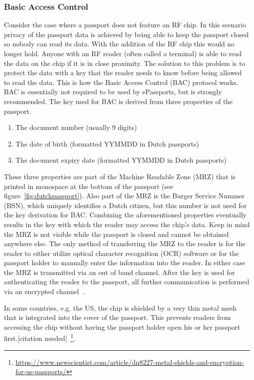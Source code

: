 \subsubsection{Basic Access Control}
Consider the case where a passport does not feature an RF chip. In this scenario privacy of the passport data is achieved by being able to keep the passport closed so nobody can read its data. With the addition of the RF chip this would no longer hold. Anyone with an RF reader (often called a terminal) is able to read the data on the chip if it is in close proximity. The solution to this problem is to protect the data with a key that the reader needs to know before being allowed to read the data. This is how the Basic Access Control (BAC) protocol works. BAC is essentially not required to be used by ePassports, but is strongly recommended. The key used for BAC is derived from three properties of the passport.
\begin{enumerate}
	\item The document number (usually 9 digits)
  \item The date of birth (formatted YYMMDD in Dutch passports)
  \item The document expiry date (formatted YYMMDD in Dutch passports)
\end{enumerate}
These three properties are part of the Machine Readable Zone (MRZ) that is printed in monospace at the bottom of the passport (see figure~\ref{fig:dutchpassport}). Also part of the MRZ is the Burger Service Nummer (BSN), which uniquely identifies a Dutch citizen, but this number is not used for the key derivation for BAC. Combining the aforementioned properties eventually results in the key with which the reader may access the chip's data. Keep in mind the MRZ is not visible while the passport is closed and cannot be obtained anywhere else. The only method of transferring the MRZ to the reader is for the reader to either utilize optical character recognition (OCR) software or for the passport holder to manually enter the information into the reader. In either case the MRZ is transmitted via an out of band channel. After the key is used for authenticating the reader to the passport, all further communication is performed via an encrypted channel~\cite{icao}.

In some countries, e.g. the US, the chip is shielded by a very thin metal mesh that is integrated into the cover of the passport. This prevents readers from accessing the chip without having the passport holder open his or her passport first.[citation needed]~\footnote{\url{https://www.newscientist.com/article/dn8227-metal-shields-and-encryption-for-us-passports/}}.

